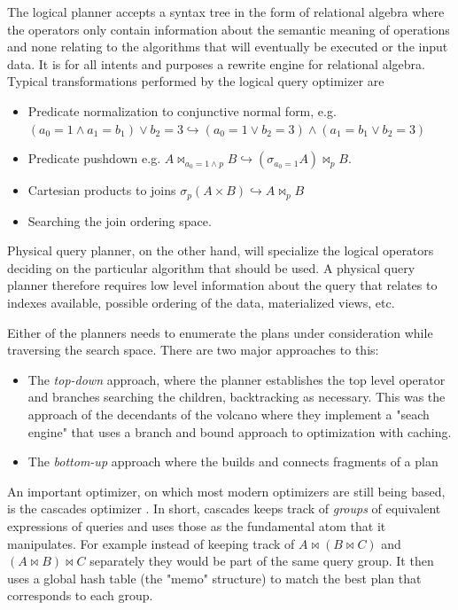 The logical planner accepts a syntax tree in the form of relational
algebra where the operators only contain information about the
semantic meaning of operations and none relating to the algorithms
that will eventually be executed or the input data. It is for all
intents and purposes a rewrite engine for relational algebra. Typical
transformations performed by the logical query optimizer are

\begin{itemize}
\item Predicate normalization to conjunctive normal form, e.g. \((a_0 = 1
  \land a_1 = b_1) \lor b_2 = 3 \hookrightarrow (a_0 = 1 \lor b_2 = 3)
  \land (a_1 = b_1 \lor b_2 = 3)\)
\item Predicate pushdown e.g. \(A \Join_{a_0 = 1 \land p} B
  \hookrightarrow (\sigma_{a_0 = 1} A) \Join_p B\).
\item Cartesian products to joins \(\sigma_p ( A \times B )
  \hookrightarrow A \Join_p B\)
\item Searching the join ordering space.
\end{itemize}

Physical query planner, on the other hand, will specialize the logical
operators deciding on the particular algorithm that should be used. A
physical query planner therefore requires low level information about
the query that relates to indexes available, possible ordering of the
data, materialized views, etc.

Either of the planners needs to enumerate the plans under
consideration while traversing the search space. There are two major
approaches to this:

\begin{itemize}
\item The \emph{top-down} approach, where the planner establishes the top level
operator and branches searching the children, backtracking as
necessary. This was the approach of the decendants of the volcano
\cite{graefeVolcanoOptimizerGenerator1993a} where they implement a
"seach engine" that uses a branch and bound approach to optimization
with caching.
\item The \emph{bottom-up} approach where the builds and connects fragments of
a plan
\cite{raasveldtDuckdbEmbeddableAnalytical2019,kemperHyPerHybridOLTP2011}
\end{itemize}

An important optimizer, on which most modern optimizers are still
being based, is the cascades optimizer
\cite{graefeCascadesFrameworkQuery1995}. In short, cascades keeps track
of \emph{groups} of equivalent expressions of queries and uses those as the
fundamental atom that it manipulates. For example instead of keeping
track of \(A \Join (B \Join C)\) and \((A \Join B) \Join C\)
separately they would be part of the same query group. It then uses a
global hash table (the "memo" structure) to match the best plan that
corresponds to each group.

